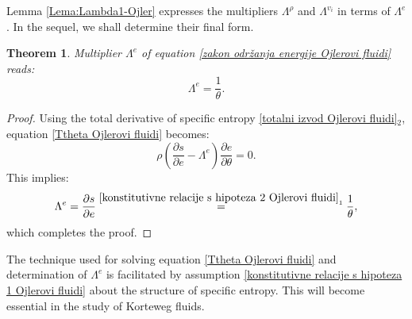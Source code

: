 \documentclass[a4paper,fleqn]{cas-sc}
\newtheorem{theorem}{Theorem}[section]
\theoremstyle{definition}
\begin{document}
Lemma \ref{Lema:Lambda1-Ojler} expresses the multipliers $\Lambda^\rho$ and $\Lambda^{v_i}$ in terms of $\Lambda^e$. In the sequel, we shall determine their final form. 
\begin{theorem} \label{Te:Lambda-e Ojler}
	Multiplier $\Lambda^{e}$ of equation \eqref{zakon održanja energije Ojlerovi fluidi} reads: 
	\begin{equation} \label{mnozitelj Lambda-e Ojlerovi fluidi}
		\Lambda^{e} = \dfrac{1}{\theta}. 
	\end{equation}
\end{theorem}

\begin{proof}
	Using the total derivative of specific entropy \eqref{totalni izvod Ojlerovi fluidi}$_{2}$, equation \eqref{Ttheta Ojlerovi fluidi} becomes: 
	\begin{equation}
		\label{Ttheta pomoćna Ojlerovi fluidi}
		\rho\left(\dfrac{\partial s}{\partial e} 
		- \Lambda^e\right) \dfrac{\partial e}{\partial\theta} = 0.
	\end{equation}
	This implies:
	\begin{equation} \label{Lambda_e Ojlerovi fluidi}
		\Lambda^e = \dfrac{\partial s}{\partial e} \overset{\eqref{konstitutivne relacije s hipoteza 2 Ojlerovi fluidi}_{1}}{=} \dfrac{1}{\theta}, 
	\end{equation} 
	which completes the proof.
\end{proof} 

The technique used for solving equation \eqref{Ttheta Ojlerovi fluidi} and determination of $\Lambda^e$ is facilitated by assumption \eqref{konstitutivne relacije s hipoteza 1 Ojlerovi fluidi} about the structure of specific entropy. This will become essential in the study of Korteweg fluids. 
\end{document}
